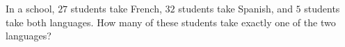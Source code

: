 In a school, $27$ students take French, $32$ students take Spanish, and $5$ students take both languages. How many of these students take exactly one of the two languages?
